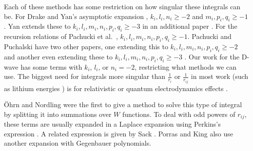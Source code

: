 \documentclass[Dissertation.tex]{subfiles}
\begin{document}
Each of these methods has some restriction on how singular these integrals 
can be. For Drake and Yan's asymptotic expansion \cite{Drake1995,Yan1997},
$k_i, l_i, n_i \geq -2$ and $m_i, p_i, q_i \geq -1$. Yan extends these to
$k_i, l_i, m_i, n_i, p_i, q_i \geq -3$ in an additional paper \cite{Yan2000a}. For 
the recursion relations of Pachucki et al.\ \cite{Pachucki2004},
$k_i, l_i, m_i, n_i, p_i, q_i \geq -1$. Pachucki and Puchalski have two other papers,
one extending this to $k_i, l_i, m_i, n_i, p_i, q_i \geq -2$ \cite{Pachucki2005} 
and another even extending these to $k_i, l_i, m_i, n_i, p_i, q_i \geq -3$ 
\cite{Pachucki2008}. Our work for the D-wave has some terms with $k_i$, $l_i$,
or $n_i = -2$, restricting what methods we can use. The biggest need for 
integrals more singular than $\frac{1}{r_i}$ or $\frac{1}{r_{ij}}$ in most 
work (such as lithium energies \cite{Yan1997a,Puchalski2010}) is for 
relativistic or quantum electrodynamics effects
\cite{Yan1997,Pachucki2008,Puchalski2010}.

{\"O}hrn and Nordling \cite{Ohrn1963} were the first to give a method to 
solve this type of integral by splitting it into summations over $W$ 
functions. To deal with odd powers of $r_{ij}$, these terms are usually 
expanded in a Laplace expansion using Perkins's expression \cite{Perkins1968}.
A related expression is given by Sack \cite{Sack1964}. Porras and King
\cite{Porras1994} also use another expansion with Gegenbauer polynomials.
\end{document}
